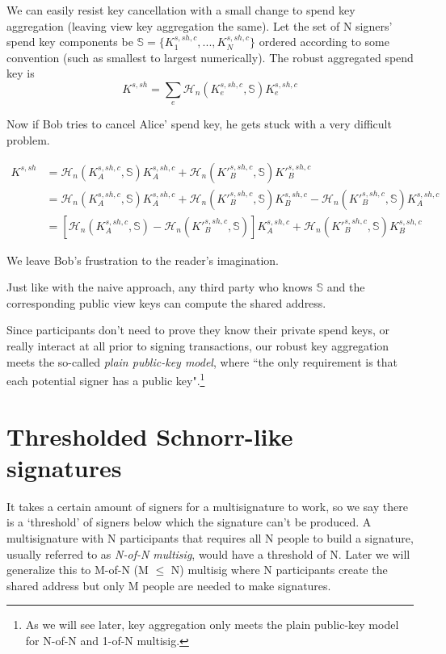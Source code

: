 We can easily resist key cancellation with a small change to spend key aggregation (leaving view key aggregation the same). Let the set of N signers' spend key components be $\mathbb{S} = \{K^{s,sh,c}_1,...,K^{s,sh,c}_N\}$ ordered according to some convention (such as smallest to largest numerically). The robust aggregated spend key is
\[K^{s,sh} = \sum_e \mathcal{H}_n(K^{s,sh,c}_e,\mathbb{S})K^{s,sh,c}_e\]

Now if Bob tries to cancel Alice' spend key, he gets stuck with a very difficult problem.

\begin{align*}
    K^{s,sh} &= \mathcal{H}_n(K^{s,sh,c}_A,\mathbb{S})K^{s,sh,c}_A +    \mathcal{H}_n(K'^{s,sh,c}_B,\mathbb{S})K'^{s,sh,c}_B \\
             &= \mathcal{H}_n(K^{s,sh,c}_A,\mathbb{S})K^{s,sh,c}_A + \mathcal{H}_n(K'^{s,sh,c}_B,\mathbb{S})K^{s,sh,c}_B - \mathcal{H}_n(K'^{s,sh,c}_B,\mathbb{S})K^{s,sh,c}_A \\
             &= [\mathcal{H}_n(K^{s,sh,c}_A,\mathbb{S}) - \mathcal{H}_n(K'^{s,sh,c}_B,\mathbb{S})]K^{s,sh,c}_A + \mathcal{H}_n(K'^{s,sh,c}_B,\mathbb{S})K^{s,sh,c}_B
\end{align*}

We leave Bob's frustration to the reader's imagination.

Just like with the naive approach, any third party who knows $\mathbb{S}$ and the corresponding public view keys can compute the shared address.

Since participants don't need to prove they know their private spend keys, or really interact at all prior to signing transactions, our robust key aggregation meets the so-called {\em plain public-key model}, where ``the only requirement is that each potential signer has a public key"\cite{maxwell2018simple}.\footnote{As we will see later, key aggregation only meets the plain public-key model for N-of-N and 1-of-N multisig.}



\section{Thresholded Schnorr-like signatures}
\label{sec:threshold-schnorr}

It takes a certain amount of signers for a multisignature to work, so we say there is a `threshold' of signers below which the signature can't be produced. A multisignature with N participants that requires all N people to build a signature, usually referred to as {\em N-of-N multisig}, would have a threshold of N. Later we will generalize this to M-of-N (M $\leq$ N) multisig where N participants create the shared address but only M people are needed to make signatures.


